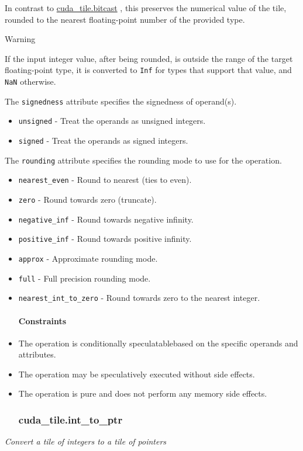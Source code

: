 \documentclass{article}
\begin{document}
In contrast to \href{https://docs.nvidia.com/cuda/tile-ir/latest/sections/operations.html#op-cuda-tile-bitcast}{cuda\_tile.bitcast} , this preserves the numerical value of the tile, rounded to the nearest floating-point number of the provided type.


Warning


If the input integer value, after being rounded, is outside the range of the target floating-point type, it is converted to \texttt{Inf} for types that support that value, and \texttt{NaN} otherwise.


The \texttt{signedness} attribute specifies the signedness of operand(s).


\begin{itemize}
\item \texttt{unsigned} - Treat the operands as unsigned integers.
\item \texttt{signed} - Treat the operands as signed integers.

\end{itemize}
The \texttt{rounding} attribute specifies the rounding mode to use for the operation.


\begin{itemize}
\item \texttt{nearest\_even} - Round to nearest (ties to even).
\item \texttt{zero} - Round towards zero (truncate).
\item \texttt{negative\_inf} - Round towards negative infinity.
\item \texttt{positive\_inf} - Round towards positive infinity.
\item \texttt{approx} - Approximate rounding mode.
\item \texttt{full} - Full precision rounding mode.
\item \texttt{nearest\_int\_to\_zero} - Round towards zero to the nearest integer.


\paragraph{Constraints}

\item The operation is conditionally speculatablebased on the specific operands and attributes.
\item The operation may be speculatively executed without side effects.
\item The operation is pure and does not perform any memory side effects.


\subsubsection{cuda\_tile.int\_to\_ptr}

\end{itemize}
\textit{Convert a tile of integers to a tile of pointers}
\end{document}
